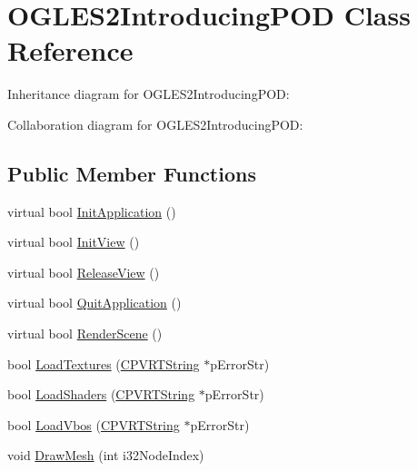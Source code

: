\hypertarget{class_o_g_l_e_s2_introducing_p_o_d}{\section{O\+G\+L\+E\+S2\+Introducing\+P\+O\+D Class Reference}
\label{class_o_g_l_e_s2_introducing_p_o_d}
}


Inheritance diagram for O\+G\+L\+E\+S2\+Introducing\+P\+O\+D\+:


Collaboration diagram for O\+G\+L\+E\+S2\+Introducing\+P\+O\+D\+:
\subsection*{Public Member Functions}
\begin{DoxyCompactItemize}
\item 
virtual bool \hyperlink{class_o_g_l_e_s2_introducing_p_o_d_ace7be359f215bc1e096c4d1663cd79c7}{Init\+Application} ()
\item 
virtual bool \hyperlink{class_o_g_l_e_s2_introducing_p_o_d_a6ca6537d8354f3a97bf0bc8014a2de3c}{Init\+View} ()
\item 
virtual bool \hyperlink{class_o_g_l_e_s2_introducing_p_o_d_ae9bb17da8af116a7592359c042040734}{Release\+View} ()
\item 
virtual bool \hyperlink{class_o_g_l_e_s2_introducing_p_o_d_a91bab486ef9ca77bc5ed830c4db5dd6c}{Quit\+Application} ()
\item 
virtual bool \hyperlink{class_o_g_l_e_s2_introducing_p_o_d_aaba65154e5c3b890a80be26c0a3d3b42}{Render\+Scene} ()
\item 
bool \hyperlink{class_o_g_l_e_s2_introducing_p_o_d_a6c9522e2e620a2c880ecb7f736381606}{Load\+Textures} (\hyperlink{class_c_p_v_r_t_string}{C\+P\+V\+R\+T\+String} $\ast$p\+Error\+Str)
\item 
bool \hyperlink{class_o_g_l_e_s2_introducing_p_o_d_a3dbf378a7d92c4eccc49a5daaba32345}{Load\+Shaders} (\hyperlink{class_c_p_v_r_t_string}{C\+P\+V\+R\+T\+String} $\ast$p\+Error\+Str)
\item 
bool \hyperlink{class_o_g_l_e_s2_introducing_p_o_d_a860640c30a505ecb7508da0f9a07b9ba}{Load\+Vbos} (\hyperlink{class_c_p_v_r_t_string}{C\+P\+V\+R\+T\+String} $\ast$p\+Error\+Str)
\item 
void \hyperlink{class_o_g_l_e_s2_introducing_p_o_d_a484e2eb394dae1d44f1eef0159f1bc50}{Draw\+Mesh} (int i32\+Node\+Index)
\end{DoxyCompactItemize}


